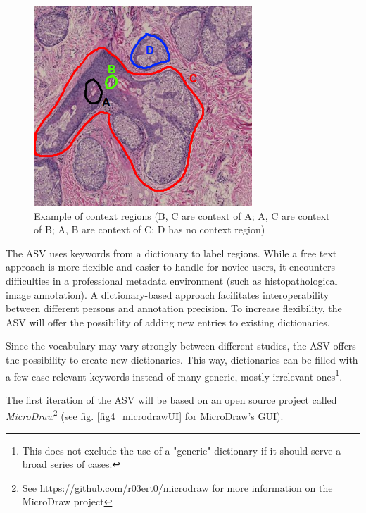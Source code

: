 \begin{figure}[H]
	\begin{center}
		\includegraphics[scale=0.55]{img/contextregions.png}
		\caption{Example of context regions (B, C are context of A; A, C are context of B; A, B are context of C; D has no context region)}
		\label{fig4_contextregions}
	\end{center}
\end{figure}

The ASV uses keywords from a dictionary to label regions. While a free text approach is more flexible and easier to handle for novice users, it encounters difficulties in a professional metadata environment (such as histopathological image annotation). A dictionary-based approach facilitates interoperability between different persons and annotation precision\cite{Frosterus11}. To increase flexibility, the ASV will offer the possibility of adding new entries to existing dictionaries.

Since the vocabulary may vary strongly between different studies, the ASV offers the possibility to create new dictionaries. This way, dictionaries can be filled with a few case-relevant keywords instead of many generic, mostly irrelevant ones\footnote{
	This does not exclude the use of a "generic" dictionary if it should serve a broad series of cases.
}.

The first iteration of the ASV will be based on an open source project called \emph{MicroDraw}\footnote{See \url{https://github.com/r03ert0/microdraw} for more information on the MicroDraw project} (see fig. \ref{fig4_microdrawUI} for MicroDraw's GUI).  

